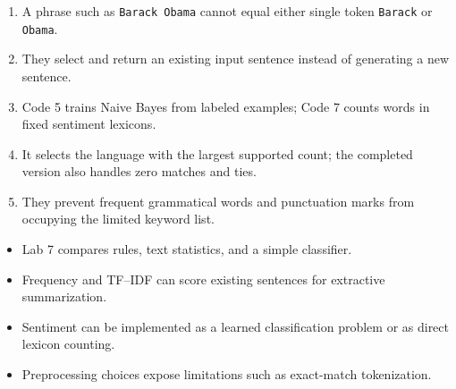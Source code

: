 \begin{checkanswers}
\begin{enumerate}
  \item A phrase such as \texttt{Barack Obama} cannot equal either single token \texttt{Barack} or \texttt{Obama}.
  \item They select and return an existing input sentence instead of generating a new sentence.
  \item Code 5 trains Naive Bayes from labeled examples; Code 7 counts words in fixed sentiment lexicons.
  \item It selects the language with the largest supported count; the completed version also handles zero matches and ties.
  \item They prevent frequent grammatical words and punctuation marks from occupying the limited keyword list.
\end{enumerate}
\end{checkanswers}

\begin{chapterrecap}
\begin{itemize}
  \item Lab 7 compares rules, text statistics, and a simple classifier.
  \item Frequency and TF--IDF can score existing sentences for extractive summarization.
  \item Sentiment can be implemented as a learned classification problem or as direct lexicon counting.
  \item Preprocessing choices expose limitations such as exact-match tokenization.
\end{itemize}
\end{chapterrecap}
